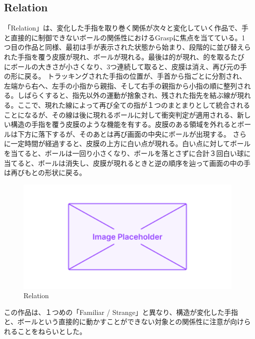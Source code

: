 \subsection*{Relation}
「Relation」は、変化した手指を取り巻く関係が次々と変化していく作品で、手と直接的に制御できないボールの関係性におけるGraspに焦点を当てている。1つ目の作品と同様、最初は手が表示された状態から始まり、段階的に並び替えられた手指を覆う皮膜が現れ、ボールが現れる。最後は的が現れ、的を取るたびにボールの大きさが小さくなり、3つ連続して取ると、皮膜は消え、再び元の手の形に戻る。
トラッキングされた手指の位置が、手首から指ごとに分割され、左端から右へ、左手の小指から親指、そして右手の親指から小指の順に整列される。しばらくすると、指先以外の運動が捨象され、残された指先を結ぶ線が現れる。ここで、現れた線によって再び全ての指が１つのまとまりとして統合されることになるが、その線は後に現れるボールに対して衝突判定が適用される、新しい構造の手指を覆う皮膜のような機能を有する。皮膜のある領域を外れるとボールは下方に落下するが、そのあとは再び画面の中央にボールが出現する。
さらに一定時間が経過すると、皮膜の上方に白い点が現れる。白い点に対してボールを当てると、ボールは一回り小さくなり、ボールを落とさずに合計３回白い球に当てると、ボールは消失し、皮膜が現れるときと逆の順序を辿って画面の中の手は再びもとの形状に戻る。
\begin{figure}[H]
  \centering
  \includegraphics[width=15cm]{img/placeholder.png}
  \caption{Relation}
  \label{fig:relation}
\end{figure}

この作品は、１つめの「Familiar / Strange」と異なり、構造が変化した手指と、ボールという直接的に動かすことができない対象との関係性に注意が向けられることをねらいとした。